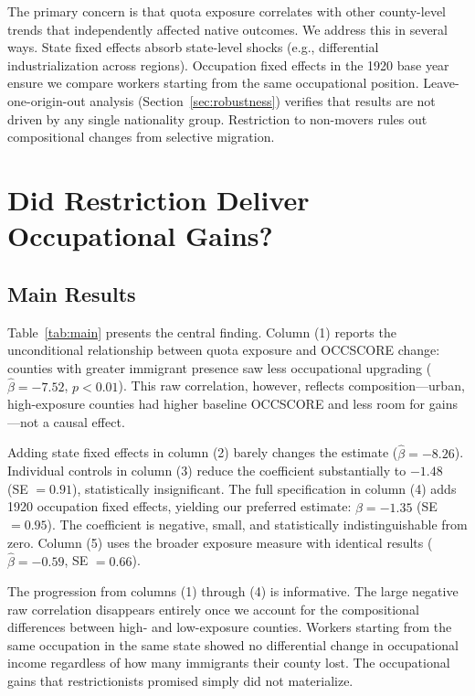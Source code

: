 \documentclass[12pt]{article}
\begin{document}
The primary concern is that quota exposure correlates with other county-level trends that independently affected native outcomes. We address this in several ways. State fixed effects absorb state-level shocks (e.g., differential industrialization across regions). Occupation fixed effects in the 1920 base year ensure we compare workers starting from the same occupational position. Leave-one-origin-out analysis (Section~\ref{sec:robustness}) verifies that results are not driven by any single nationality group. Restriction to non-movers rules out compositional changes from selective migration.



\section{Did Restriction Deliver Occupational Gains?}
\label{sec:occupational}

\subsection{Main Results}

Table~\ref{tab:main} presents the central finding. Column (1) reports the unconditional relationship between quota exposure and OCCSCORE change: counties with greater immigrant presence saw less occupational upgrading ($\hat{\beta} = -7.52$, $p < 0.01$). This raw correlation, however, reflects composition---urban, high-exposure counties had higher baseline OCCSCORE and less room for gains---not a causal effect.

Adding state fixed effects in column (2) barely changes the estimate ($\hat{\beta} = -8.26$). Individual controls in column (3) reduce the coefficient substantially to $-1.48$ (SE $= 0.91$), statistically insignificant. The full specification in column (4) adds 1920 occupation fixed effects, yielding our preferred estimate: $\hat{\beta} = -1.35$ (SE $= 0.95$). The coefficient is negative, small, and statistically indistinguishable from zero. Column (5) uses the broader exposure measure with identical results ($\hat{\beta} = -0.59$, SE $= 0.66$).

The progression from columns (1) through (4) is informative. The large negative raw correlation disappears entirely once we account for the compositional differences between high- and low-exposure counties. Workers starting from the same occupation in the same state showed no differential change in occupational income regardless of how many immigrants their county lost. The occupational gains that restrictionists promised simply did not materialize.
\end{document}
